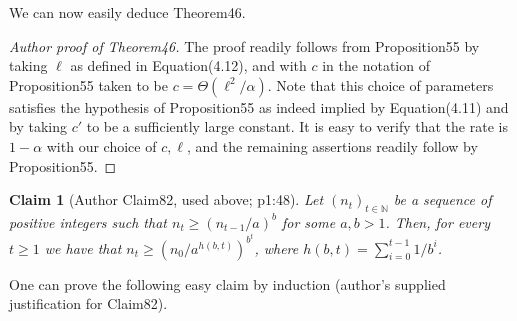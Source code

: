 \documentclass[10pt,a4paper]{article}
\newtheorem{ntclaim}[nttheorem]{Claim}
\begin{document}
We can now easily deduce Theorem46.
\begin{proof}[Author proof of Theorem46]
The proof readily follows from Proposition55 by taking $\ell$ as defined in Equation(4.12), and with $c$ in the notation of Proposition55 taken to be $c=\Theta(\ell^2/\alpha)$. Note that this choice of parameters satisfies the hypothesis of Proposition55 as indeed implied by Equation(4.11) and by taking $c'$ to be a sufficiently large constant. It is easy to verify that the rate is $1-\alpha$ with our choice of $c,\ell$, and the remaining assertions readily follow by Proposition55.
\end{proof}
\setcounter{nttheorem}{81}
\begin{ntclaim}[Author Claim82, used above; p1:48]
Let $(n_t)_{t\in\mathbb N}$ be a sequence of positive integers such that $n_t\geq(n_{t-1}/a)^b$ for some $a,b>1$. Then, for every $t\geq1$ we have that $n_t\geq(n_0/a^{h(b,t)})^{b^t}$, where $h(b,t)=\sum_{i=0}^{t-1}1/b^i$.
\end{ntclaim}
One can prove the following easy claim by induction (author's supplied justification for Claim82).
\end{document}
